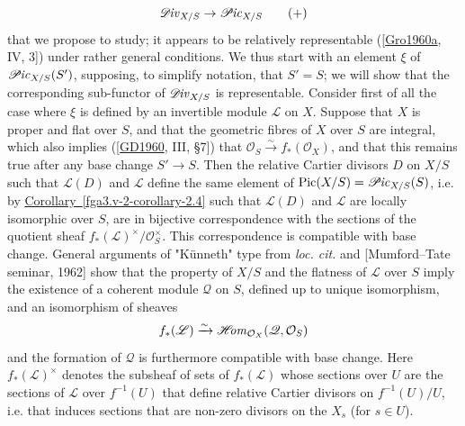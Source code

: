   \[     \mathscr {D}\kern  -1pt\mathit {iv}_{X/S}     \to  \mathscr {P}\kern  -1pt\mathit {ic}_{X/S}   \tag{+}   \]
  that we propose to study;
  it appears to be relatively representable ([\hyperref[Gro1960a]{Gro1960a}, IV, 3]) under rather general conditions.
  We thus start with an element \(\xi \) of \(\mathscr {P}\kern  -1pt\mathit {ic}_{X/S}(S')\), supposing, to simplify notation, that \(S'=S\);
  we will show that the corresponding sub-functor of \(\mathscr {D}\kern  -1pt\mathit {iv}_{X/S}\) is representable.
  Consider first of all the case where \(\xi \) is defined by an invertible module \(\mathscr {L}\) on \(X\).
  Suppose that \(X\) is proper and flat over \(S\), and that the geometric fibres of \(X\) over \(S\) are integral, which also implies ([\hyperref[GD1960]{GD1960}, III, §7]) that \(\mathcal {O}_S\xrightarrow {\sim } f_*(\mathcal {O}_X)\), and that this remains true after any base change \(S'\to  S\).
  Then the relative Cartier divisors \(D\) on \(X/S\) such that \(\mathscr {L}(D)\) and \(\mathscr {L}\) define the same element of \(\operatorname {Pic}(X/S)=\mathscr {P}\kern  -1pt\mathit {ic}_{X/S}(S)\), i.e. by \hyperref[fga3.v-2-corollary-2.4]{Corollary~\ref*{fga3.v-2-corollary-2.4}} such that \(\mathscr {L}(D)\) and \(\mathscr {L}\) are locally isomorphic over \(S\), are in bijective correspondence with the sections of the quotient sheaf \(f_*(\mathscr {L})^{\times }/\mathscr {O}_S^\times \).
  This correspondence is compatible with base change.
  General arguments of "Künneth" type from \emph{loc. cit.} and [Mumford–Tate seminar, 1962] show that the property of \(X/S\) and the flatness of \(\mathscr {L}\) over \(S\) imply the existence of a coherent module \(\mathscr {Q}\) on \(S\), defined up to unique isomorphism, and an isomorphism of sheaves
  \[     f_*(\mathscr {L})     \xrightarrow {\sim } \mathscr {H}\kern  -2.5pt\mathit {om}_{\mathcal {O}_X}(\mathscr {Q},\mathcal {O}_S)   \]
  and the formation of \(\mathscr {Q}\) is furthermore compatible with base change.
  Here \(f_*(\mathscr {L})^\times \) denotes the subsheaf of sets of \(f_*(\mathscr {L})\) whose sections over \(U\) are the sections of \(\mathscr {L}\) over \(f^{-1}(U)\) that define relative Cartier divisors on \(f^{-1}(U)/U\), i.e. that induces sections that are non-zero divisors on the \(X_s\) (for \(s\in  U\)).
  
